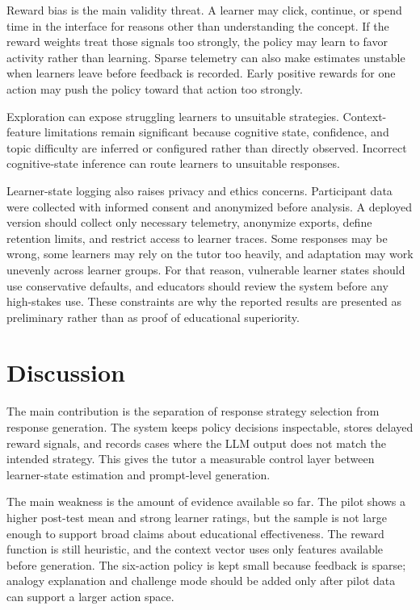 \documentclass[conference]{IEEEtran}
\begin{document}
Reward bias is the main validity threat. A learner may click, continue, or spend time in the interface for reasons other than understanding the concept. If the reward weights treat those signals too strongly, the policy may learn to favor activity rather than learning. Sparse telemetry can also make estimates unstable when learners leave before feedback is recorded. Early positive rewards for one action may push the policy toward that action too strongly.

Exploration can expose struggling learners to unsuitable strategies. Context-feature limitations remain significant because cognitive state, confidence, and topic difficulty are inferred or configured rather than directly observed. Incorrect cognitive-state inference can route learners to unsuitable responses.

Learner-state logging also raises privacy and ethics concerns. Participant data were collected with informed consent and anonymized before analysis. A deployed version should collect only necessary telemetry, anonymize exports, define retention limits, and restrict access to learner traces. Some responses may be wrong, some learners may rely on the tutor too heavily, and adaptation may work unevenly across learner groups. For that reason, vulnerable learner states should use conservative defaults, and educators should review the system before any high-stakes use. These constraints are why the reported results are presented as preliminary rather than as proof of educational superiority.

\section{Discussion}

The main contribution is the separation of response strategy selection from response generation. The system keeps policy decisions inspectable, stores delayed reward signals, and records cases where the LLM output does not match the intended strategy. This gives the tutor a measurable control layer between learner-state estimation and prompt-level generation.

The main weakness is the amount of evidence available so far. The pilot shows a higher post-test mean and strong learner ratings, but the sample is not large enough to support broad claims about educational effectiveness. The reward function is still heuristic, and the context vector uses only features available before generation. The six-action policy is kept small because feedback is sparse; analogy explanation and challenge mode should be added only after pilot data can support a larger action space.
\end{document}
